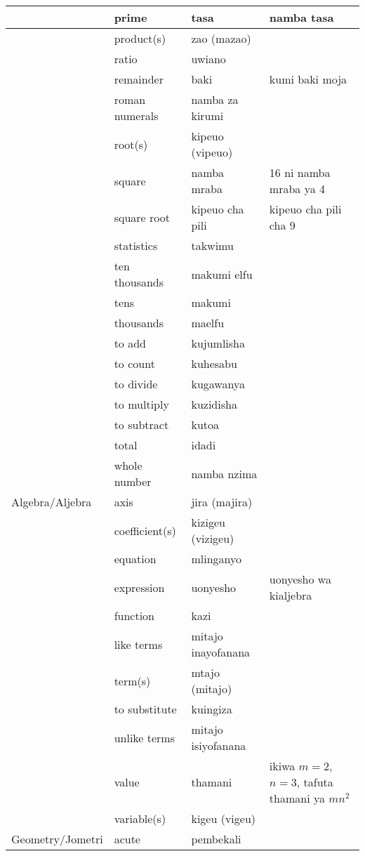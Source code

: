 \begin{center}
\begin{longtable}{|m{2cm}|m{4cm}|m{4cm}|m{4cm}|}
	&	prime	&	tasa	&	namba tasa	\\	\hline
	&	product(s)	&	zao (mazao)	&		\\	\hline
	&	ratio	&	uwiano	&		\\	\hline
	&	remainder	&	baki	&	kumi baki moja	\\	\hline
	&	roman numerals	&	namba za kirumi	&		\\	\hline
	&	root(s)	&	kipeuo (vipeuo)	&		\\	\hline
	&	square	&	namba mraba	&	16 ni namba mraba ya 4	\\	\hline
	&	square root	&	kipeuo cha pili	&	kipeuo cha pili cha 9	\\	\hline
	&	statistics	&	takwimu	&		\\	\hline
	&	ten thousands	&	makumi elfu	&		\\	\hline
	&	tens	&	makumi	&		\\	\hline
	&	thousands	&	maelfu	&		\\	\hline
	&	to add	&	kujumlisha	&		\\	\hline
	&	to count	&	kuhesabu	&		\\	\hline
	&	to divide	&	kugawanya	&		\\	\hline
	&	to multiply	&	kuzidisha	&		\\	\hline
	&	to subtract	&	kutoa	&		\\	\hline
	&	total	&	idadi	&		\\	\hline
	&	whole number	&	namba nzima	&		\\	\hline
Algebra\slash Aljebra	&	axis	&	jira (majira)	&		\\	\hline
	&	coefficient(s)	&	kizigeu (vizigeu)	&		\\	\hline
	&	equation	&	mlinganyo	&		\\	\hline
	&	expression	&	uonyesho	&	uonyesho wa kialjebra	\\	\hline
	&	function	&	kazi	&		\\	\hline
	&	like terms	&	mitajo inayofanana	&		\\	\hline
	&	term(s)	&	mtajo (mitajo)	&		\\	\hline
	&	to substitute	&	kuingiza	&		\\	\hline
	&	unlike terms	&	mitajo isiyofanana	&		\\	\hline
	&	value	&	thamani	&	ikiwa $m=2$, $n=3$, tafuta thamani ya $mn^2$	\\	\hline
	&	variable(s)	&	kigeu (vigeu)	&		\\	\hline
Geometry\slash Jometri	&	acute	&	pembekali	&		\\	\hline

\end{longtable}
\end{center}
